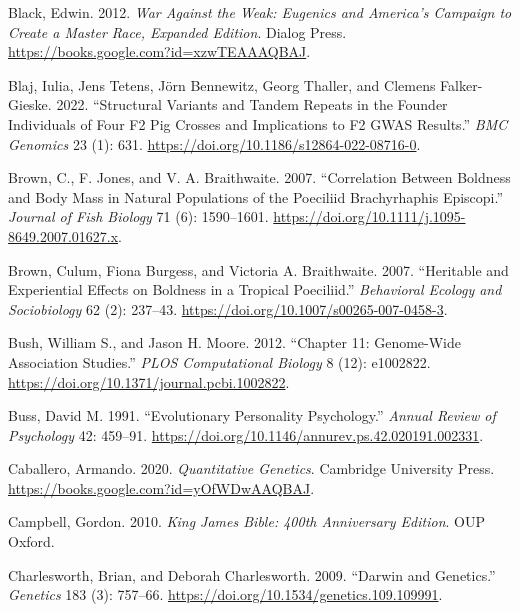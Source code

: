 \documentclass[
]{book}
\newlength{\cslhangindent}
\newlength{\cslentryspacingunit} %
\newenvironment{CSLReferences}[2] %
 {%
  \setlength{\parindent}{0pt}
  \ifodd #1
  \let\oldpar\par
  \def\par{\hangindent=\cslhangindent\oldpar}
  \fi
  \setlength{\parskip}{#2\cslentryspacingunit}
 }%
 {}
\begin{document}
\begin{CSLReferences}{1}{0}
\leavevmode{}%
Black, Edwin. 2012. \emph{War {Against} the {Weak}: {Eugenics} and {America}'s {Campaign} to {Create} a {Master Race}, {Expanded Edition}}. {Dialog Press}. \url{https://books.google.com?id=xzwTEAAAQBAJ}.

\leavevmode{}%
Blaj, Iulia, Jens Tetens, Jörn Bennewitz, Georg Thaller, and Clemens Falker-Gieske. 2022. {``Structural Variants and Tandem Repeats in the Founder Individuals of Four {F2} Pig Crosses and Implications to {F2 GWAS} Results.''} \emph{BMC Genomics} 23 (1): 631. \url{https://doi.org/10.1186/s12864-022-08716-0}.

\leavevmode{}%
Brown, C., F. Jones, and V. A. Braithwaite. 2007. {``Correlation Between Boldness and Body Mass in Natural Populations of the Poeciliid {Brachyrhaphis} Episcopi.''} \emph{Journal of Fish Biology} 71 (6): 1590--1601. \url{https://doi.org/10.1111/j.1095-8649.2007.01627.x}.

\leavevmode{}%
Brown, Culum, Fiona Burgess, and Victoria A. Braithwaite. 2007. {``Heritable and Experiential Effects on Boldness in a Tropical Poeciliid.''} \emph{Behavioral Ecology and Sociobiology} 62 (2): 237--43. \url{https://doi.org/10.1007/s00265-007-0458-3}.

\leavevmode{}%
Bush, William S., and Jason H. Moore. 2012. {``Chapter 11: {Genome-Wide Association Studies}.''} \emph{PLOS Computational Biology} 8 (12): e1002822. \url{https://doi.org/10.1371/journal.pcbi.1002822}.

\leavevmode{}%
Buss, David M. 1991. {``Evolutionary Personality Psychology.''} \emph{Annual Review of Psychology} 42: 459--91. \url{https://doi.org/10.1146/annurev.ps.42.020191.002331}.

\leavevmode{}%
Caballero, Armando. 2020. \emph{Quantitative {Genetics}}. {Cambridge University Press}. \url{https://books.google.com?id=yOfWDwAAQBAJ}.

\leavevmode{}%
Campbell, Gordon. 2010. \emph{King {James Bible}: 400th {Anniversary Edition}}. {OUP Oxford}.

\leavevmode{}%
Charlesworth, Brian, and Deborah Charlesworth. 2009. {``Darwin and {Genetics}.''} \emph{Genetics} 183 (3): 757--66. \url{https://doi.org/10.1534/genetics.109.109991}.


\end{CSLReferences}
\end{document}
